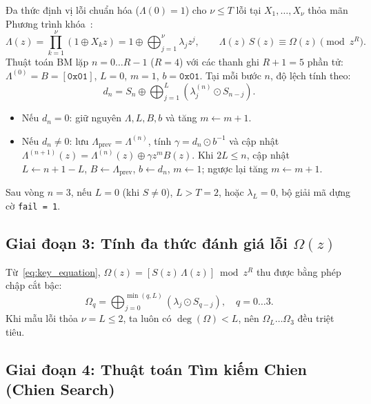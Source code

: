 \documentclass[11pt,a4paper]{report}
\begin{document}
Đa thức định vị lỗi chuẩn hóa ($\Lambda(0) = 1$) cho $\nu \le T$ lỗi tại $X_1, \dots, X_\nu$ thỏa mãn Phương trình khóa~\cite{berlekamp1968,massey1969}:
\begin{equation}
\Lambda(z) = \prod_{k=1}^{\nu} (1 \oplus X_k z) = 1 \oplus \bigoplus_{j=1}^{\nu} \lambda_j z^j, \qquad \Lambda(z)\,S(z) \equiv \Omega(z) \pmod{z^R}.
\label{eq:key_equation}
\end{equation}
Thuật toán BM lặp $n = 0 \dots R-1$ ($R=4$) với các thanh ghi $R+1 = 5$ phần tử: $\Lambda^{(0)} = B = [\texttt{0x01}]$, $L = 0$, $m = 1$, $b = \texttt{0x01}$. Tại mỗi bước $n$, độ lệch tính theo:
\begin{equation}
d_n = S_n \oplus \bigoplus_{j=1}^{L} \left(\lambda_j^{(n)} \odot S_{n-j}\right).
\label{eq:bm_discrepancy}
\end{equation}
\begin{itemize}
    \item Nếu $d_n = 0$: giữ nguyên $\Lambda, L, B, b$ và tăng $m \leftarrow m + 1$.
    \item Nếu $d_n \neq 0$: lưu $\Lambda_{\text{prev}} = \Lambda^{(n)}$, tính $\gamma = d_n \odot b^{-1}$ và cập nhật $\Lambda^{(n+1)}(z) = \Lambda^{(n)}(z) \oplus \gamma z^m B(z)$. Khi $2L \le n$, cập nhật $L \leftarrow n + 1 - L$, $B \leftarrow \Lambda_{\text{prev}}$, $b \leftarrow d_n$, $m \leftarrow 1$; ngược lại tăng $m \leftarrow m + 1$.
\end{itemize}
Sau vòng $n = 3$, nếu $L = 0$ (khi $S \neq 0$), $L > T = 2$, hoặc $\lambda_L = 0$, bộ giải mã dựng cờ \texttt{fail = 1}.

\subsection{Giai đoạn 3: Tính đa thức đánh giá lỗi \texorpdfstring{$\Omega(z)$}{Omega(z)}}

Từ~\eqref{eq:key_equation}, $\Omega(z) = [S(z)\,\Lambda(z)] \bmod z^R$ thu được bằng phép chập cắt bậc:
\begin{equation}
\Omega_q = \bigoplus_{j=0}^{\min(q, L)} \left(\lambda_j \odot S_{q-j}\right), \quad q = 0 \dots 3.
\label{eq:omega_def}
\end{equation}
Khi mẫu lỗi thỏa $\nu = L \le 2$, ta luôn có $\deg(\Omega) < L$, nên $\Omega_L \dots \Omega_3$ đều triệt tiêu.

\subsection{Giai đoạn 4: Thuật toán Tìm kiếm Chien (Chien Search)}
\end{document}
